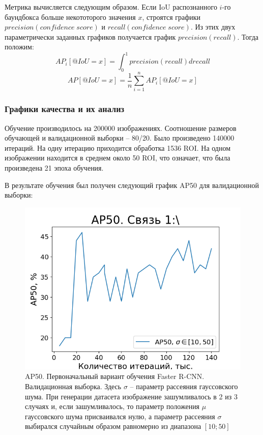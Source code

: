 Метрика вычисляется следующим образом. Если IoU распознанного $i$-го баундбокса больше некототорого значения $x$, строятся графики $precision(confidence \; score)$ и $recall(confidence \; score)$. Из этих двух параметрически заданных графиков получается график $precision(recall)$. Тогда положим:
\begin{equation}
	AP_{i}[@IoU=x] = \int_0^1 \displaystyle precision(recall)drecall
\end{equation}
\begin{equation}
	AP[@IoU=x] = \frac{1}{n} \sum_{i=1}^{n} \displaystyle AP_{i}[@IoU=x]
\end{equation}

\subsubsection{Графики качества и их анализ}

Обучение производилось на 200000 изображениях. Соотношение размеров обучающей и валидационной выборки -- 80/20. Было произведено 140000 итераций. На одну итерацию приходится обработка 1536 ROI. На одном изображении находится в среднем около 50 ROI, что означает, что была произведена 21 эпоха обучения.

В результате обучения был получен следующий график AP50 для валидационной выборки:

\begin{figure}[ht!] 
	\center
	\includegraphics [scale=0.6] {my_folder/images/AP50_first}
	\caption{AP50. Первоначальный вариант обучения Faster R-CNN. Валидационная выборка. Здесь $\sigma$ -- параметр рассеяния гауссовского шума. При генерации датасета изображение зашумливалось в 2 из 3 случаях и, если зашумливалось, то параметр положения $\mu$ гауссовского шума присваивался нулю, а параметр рассеяния $\sigma$ выбирался случайным образом равномерно из диапазона $[10; 50]$}
	\label{fig:AP50_first}
\end{figure}

